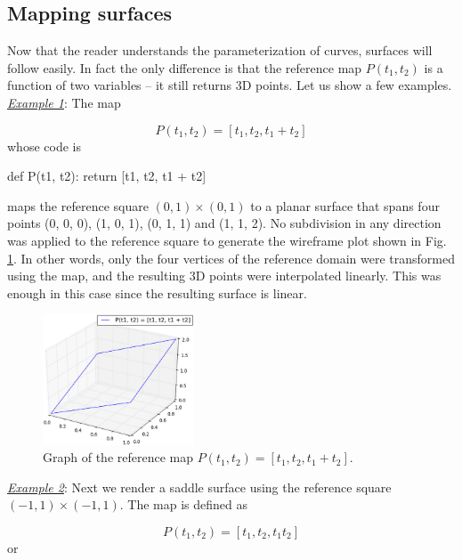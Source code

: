 \subsection{Mapping surfaces}

Now that the reader understands the parameterization of curves, surfaces will 
follow easily. In fact the only difference is that the reference map 
$P(t_1, t_2)$ is a function of two variables -- it still returns 3D points. 
Let us show a few examples.\\

\noindent
\underline{\em Example 1}: The map

$$
P(t_1, t_2) = [t_1, t_2, t_1 + t_2]
$$
\noindent
whose code is

\begin{bbox}
def P(t1, t2):
    return [t1, t2, t1 + t2]
\end{bbox}
maps the reference square $(0, 1)\times(0, 1)$ to a planar surface that spans
four points (0, 0, 0), (1, 0, 1), (0, 1, 1) and (1, 1, 2). No subdivision in
any direction was applied to the reference square to generate the wireframe plot 
shown in Fig. \ref{fig:paramsu1}. In other words, only the four vertices of the reference domain 
were transformed using the map, and the resulting 3D points were interpolated
linearly. This was enough in this case since the resulting surface is linear.

\begin{figure}[!ht]
\begin{center}
\includegraphics[width=0.4\textwidth]{img/paramsu1.png}
\end{center}
\vspace{-6mm}
\caption{Graph of the reference map $P(t_1, t_2) = [t_1, t_2, t_1 + t_2]$.}
\label{fig:paramsu1}
\end{figure}
\noindent

\noindent
\underline{\em Example 2}: Next we render a saddle surface
using the reference square $(-1, 1)\times(-1, 1)$. 
The map is defined as

$$
P(t_1, t_2) = [t_1, t_2, t_1 t_2]
$$
or

